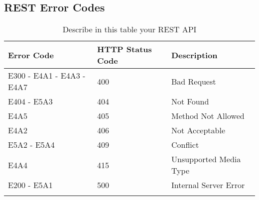 \subsection{REST Error Codes}


\begin{longtable}{|p{}|p{} |p{}|} 
\hline
\textbf{Error Code} & \textbf{HTTP Status Code} & \textbf{Description} \\\hline

E300 - E4A1 - E4A3 - E4A7 & 400 &  Bad Request\\\hline
E404 - E5A3 & 404 &  Not Found\\\hline
E4A5 & 405 & Method Not Allowed \\\hline 
E4A2 & 406 & Not Acceptable \\\hline 
E5A2 - E5A4 & 409 &  Conflict\\\hline
E4A4 & 415 &  Unsupported Media Type \\\hline
E200 - E5A1 & 500 &  Internal Server Error\\\hline

\caption{Describe in this table your REST API}
\label{tab:termGlossary}
\end{longtable}\newpage